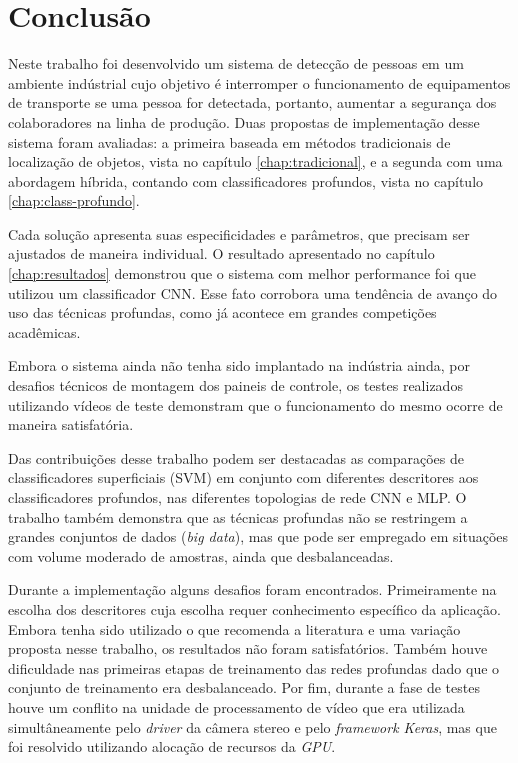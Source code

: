 \chapter{Conclusão} \label{chap:conclusao}

Neste trabalho foi desenvolvido um sistema de detecção de pessoas em um ambiente indústrial cujo objetivo é interromper o funcionamento de equipamentos de transporte se uma pessoa for detectada, portanto, aumentar a segurança dos colaboradores na linha de produção. Duas propostas de implementação desse sistema foram avaliadas: a primeira baseada em métodos tradicionais de localização de objetos, vista no capítulo \ref{chap:tradicional}, e a segunda com uma abordagem híbrida, contando com classificadores profundos, vista no capítulo \ref{chap:class-profundo}. 

Cada solução apresenta suas especificidades e parâmetros, que precisam ser ajustados de maneira individual. O resultado apresentado no capítulo \ref{chap:resultados} demonstrou que o sistema com melhor performance foi que utilizou um classificador CNN. Esse fato corrobora uma tendência de avanço do uso das técnicas profundas, como já acontece em grandes competições acadêmicas.

Embora o sistema ainda não tenha sido implantado na indústria ainda, por desafios técnicos de montagem dos paineis de controle, os testes realizados utilizando vídeos de teste demonstram que o funcionamento do mesmo ocorre de maneira satisfatória. 

Das contribuições desse trabalho podem ser destacadas as comparações de classificadores superficiais (SVM) em conjunto com diferentes descritores aos classificadores profundos, nas diferentes topologias de rede CNN e MLP. O trabalho também demonstra que as técnicas profundas não se restringem a grandes conjuntos de dados (\textit{big data}), mas que pode ser empregado em situações com volume moderado de amostras, ainda que desbalanceadas.

Durante a implementação alguns desafios foram encontrados. Primeiramente na escolha dos descritores cuja escolha requer conhecimento específico da aplicação. Embora tenha sido utilizado o que recomenda a literatura e uma variação proposta nesse trabalho, os resultados não foram satisfatórios. Também houve dificuldade nas primeiras etapas de treinamento das redes profundas dado que o conjunto de treinamento era desbalanceado. Por fim, durante a fase de testes houve um conflito na unidade de processamento de vídeo que era utilizada simultâneamente pelo \textit{driver} da câmera stereo e pelo \textit{framework Keras}, mas que foi resolvido utilizando alocação de recursos da \textit{GPU}.

